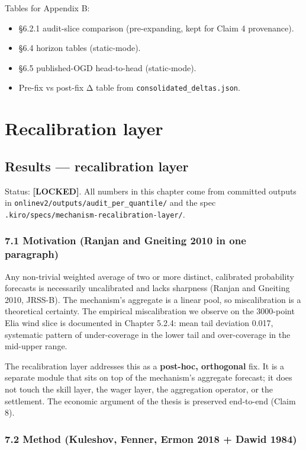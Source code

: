 \documentclass[11pt,a4paper,openany]{report}
\begin{document}
Tables for Appendix B:
\begin{itemize}
  \item §6.2.1 audit-slice comparison (pre-expanding, kept for Claim 4
    provenance).
  \item §6.4 horizon tables (static-mode).
  \item §6.5 published-OGD head-to-head (static-mode).
  \item Pre-fix vs post-fix Δ table from \texttt{consolidated\_deltas.json}.
\end{itemize}

\part*{Recalibration layer}
\chapter{Results — recalibration layer}

Status: \textbf{[LOCKED]}. All numbers in this chapter come from committed
outputs in \texttt{onlinev2/outputs/audit\_per\_quantile/} and the spec
\texttt{.kiro/specs/mechanism-recalibration-layer/}.

\section{7.1 Motivation (Ranjan and Gneiting 2010 in one paragraph)}

Any non-trivial weighted average of two or more distinct, calibrated
probability forecasts is necessarily uncalibrated and lacks sharpness
(Ranjan and Gneiting 2010, JRSS-B). The mechanism's aggregate is a
linear pool, so miscalibration is a theoretical certainty. The
empirical miscalibration we observe on the 3000-point Elia wind slice is
documented in Chapter 5.2.4: mean tail deviation 0.017, systematic
pattern of under-coverage in the lower tail and over-coverage in the
mid-upper range.

The recalibration layer addresses this as a \textbf{post-hoc, orthogonal} fix.
It is a separate module that sits on top of the mechanism's aggregate
forecast; it does not touch the skill layer, the wager layer, the
aggregation operator, or the settlement. The economic argument of the
thesis is preserved end-to-end (Claim 8).

\section{7.2 Method (Kuleshov, Fenner, Ermon 2018 + Dawid 1984)}
\end{document}
